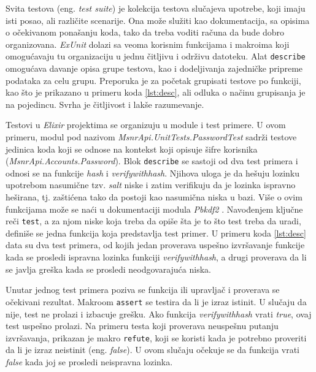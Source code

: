 \documentclass[12pt,oneside]{memoir}
\begin{document}
\par Svita testova (eng. \emph{test suite}) je kolekcija testova slučajeva upotrebe, koji imaju isti posao, ali različite scenarije. Ona može služiti kao dokumentacija, sa opisima o očekivanom ponašanju koda, tako da treba voditi računa da bude dobro organizovana. \emph{ExUnit} dolazi sa veoma korisnim funkcijama i makroima koji omogućavaju tu organizaciju u jednu čitljivu i održivu datoteku. Alat \texttt{describe} omogućava davanje opisa grupe testova, kao i dodeljivanja zajedničke pripreme podataka za celu grupu. Preporuka je za početak grupisati testove po funkciji, kao što je prikazano u primeru koda \ref{lst:desc}, ali odluka o načinu grupisanja je na pojedincu. Svrha je čitljivost i lakše razumevanje.
\par Testovi u \emph{Elixir} projektima se organizuju u module i test primere. U ovom primeru, modul pod nazivom \emph{MsnrApi.UnitTests.PasswordTest} sadrži testove jedinica koda koji se odnose na kontekst koji opisuje šifre korisnika (\emph{MsnrApi.Accounts.Password}). Blok \texttt{describe} se sastoji od dva test primera i odnosi se na funkcije \emph{hash} i \emph{verify{\textunderscore}with{\textunderscore}hash}. Njihova uloga je da hešuju lozinku upotrebom nasumične tzv. \emph{salt} niske i zatim verifikuju da je lozinka ispravno heširana, tj. zaštićena tako da postoji kao nasumična niska u bazi. Više o ovim funkcijama može se naći u dokumentaciji modula \emph{Pbkdf2} \cite{pbk}. Navođenjem ključne reči \texttt{test}, a za njom niske koja treba da opiše šta je to što test treba da uradi, definiše se jedna funkcija koja predstavlja test primer. U primeru koda \ref{lst:desc} data su dva test primera, od kojih jedan proverava uspešno izvršavanje funkcije kada se prosledi ispravna lozinka funkciji \emph{verify{\textunderscore}with{\textunderscore}hash}, a drugi proverava da li se javlja greška kada se prosledi neodgovarajuća niska. 
 

\par Unutar jednog test primera poziva se funkcija ili upravljač i proverava se očekivani rezultat. Makroom \texttt{assert} se testira da li je izraz istinit. U slučaju da nije, test ne prolazi i izbacuje grešku. Ako funkcija \emph{verify{\textunderscore}with{\textunderscore}hash} vrati \emph{true}, ovaj test uspešno prolazi. Na primeru testa koji proverava neuspešnu putanju izvršavanja, prikazan je makro \texttt{refute}, koji se koristi kada je potrebno proveriti da li je izraz neistinit (eng. \emph{false}). U ovom slučaju očekuje se da funkcija vrati \emph{false} kada joj se prosledi neispravna lozinka. \\
\end{document}
